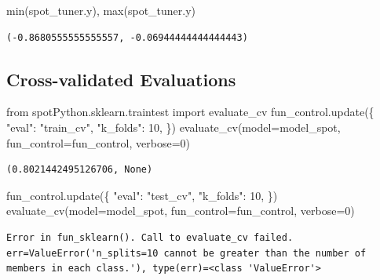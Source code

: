 \documentclass[
  letterpaper,
  DIV=11,
  numbers=noendperiod]{scrreprt}
\newenvironment{Shaded}{\begin{snugshade}}{\end{snugshade}}
\newcommand{\BuiltInTok}[1]{\textcolor[rgb]{0.00,0.23,0.31}{#1}}
\newcommand{\DecValTok}[1]{\textcolor[rgb]{0.68,0.00,0.00}{#1}}
\newcommand{\ImportTok}[1]{\textcolor[rgb]{0.00,0.46,0.62}{#1}}
\newcommand{\NormalTok}[1]{\textcolor[rgb]{0.00,0.23,0.31}{#1}}
\newcommand{\OperatorTok}[1]{\textcolor[rgb]{0.37,0.37,0.37}{#1}}
\newcommand{\StringTok}[1]{\textcolor[rgb]{0.13,0.47,0.30}{#1}}
\begin{document}
\begin{Shaded}
\begin{Highlighting}[]
\BuiltInTok{min}\NormalTok{(spot\_tuner.y), }\BuiltInTok{max}\NormalTok{(spot\_tuner.y)}
\end{Highlighting}
\end{Shaded}

\begin{verbatim}
(-0.8680555555555557, -0.06944444444444443)
\end{verbatim}

\hypertarget{cross-validated-evaluations-1}{%
\subsection{Cross-validated
Evaluations}\label{cross-validated-evaluations-1}}

\begin{Shaded}
\begin{Highlighting}[]
\ImportTok{from}\NormalTok{ spotPython.sklearn.traintest }\ImportTok{import}\NormalTok{ evaluate\_cv}
\NormalTok{fun\_control.update(\{}
     \StringTok{"eval"}\NormalTok{: }\StringTok{"train\_cv"}\NormalTok{,}
     \StringTok{"k\_folds"}\NormalTok{: }\DecValTok{10}\NormalTok{,}
\NormalTok{\})}
\NormalTok{evaluate\_cv(model}\OperatorTok{=}\NormalTok{model\_spot, fun\_control}\OperatorTok{=}\NormalTok{fun\_control, verbose}\OperatorTok{=}\DecValTok{0}\NormalTok{)}
\end{Highlighting}
\end{Shaded}

\begin{verbatim}
(0.8021442495126706, None)
\end{verbatim}

\begin{Shaded}
\begin{Highlighting}[]
\NormalTok{fun\_control.update(\{}
     \StringTok{"eval"}\NormalTok{: }\StringTok{"test\_cv"}\NormalTok{,}
     \StringTok{"k\_folds"}\NormalTok{: }\DecValTok{10}\NormalTok{,}
\NormalTok{\})}
\NormalTok{evaluate\_cv(model}\OperatorTok{=}\NormalTok{model\_spot, fun\_control}\OperatorTok{=}\NormalTok{fun\_control, verbose}\OperatorTok{=}\DecValTok{0}\NormalTok{)}
\end{Highlighting}
\end{Shaded}

\begin{verbatim}
Error in fun_sklearn(). Call to evaluate_cv failed. err=ValueError('n_splits=10 cannot be greater than the number of members in each class.'), type(err)=<class 'ValueError'>
\end{verbatim}
\end{document}
